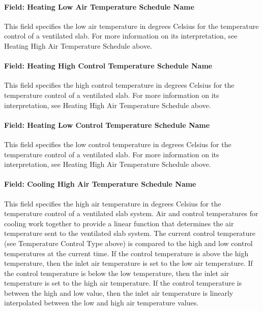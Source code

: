 \paragraph{Field: Heating Low Air Temperature Schedule Name}\label{field-heating-low-air-temperature-schedule-name}

This field specifies the low air temperature in degrees Celsius for the temperature control of a ventilated slab. For more information on its interpretation, see Heating High Air Temperature Schedule above.

\paragraph{Field: Heating High Control Temperature Schedule Name}\label{field-heating-high-control-temperature-schedule-name-1}

This field specifies the high control temperature in degrees Celsius for the temperature control of a ventilated slab. For more information on its interpretation, see Heating High Air Temperature Schedule above.

\paragraph{Field: Heating Low Control Temperature Schedule Name}\label{field-heating-low-control-temperature-schedule-name-1}

This field specifies the low control temperature in degrees Celsius for the temperature control of a ventilated slab. For more information on its interpretation, see Heating High Air Temperature Schedule above.

\paragraph{Field: Cooling High Air Temperature Schedule Name}\label{field-cooling-high-air-temperature-schedule-name}

This field specifies the high air temperature in degrees Celsius for the temperature control of a ventilated slab system. Air and control temperatures for cooling work together to provide a linear function that determines the air temperature sent to the ventilated slab system. The current control temperature (see Temperature Control Type above) is compared to the high and low control temperatures at the current time. If the control temperature is above the high temperature, then the inlet air temperature is set to the low air temperature. If the control temperature is below the low temperature, then the inlet air temperature is set to the high air temperature. If the control temperature is between the high and low value, then the inlet air temperature is linearly interpolated between the low and high air temperature values.

